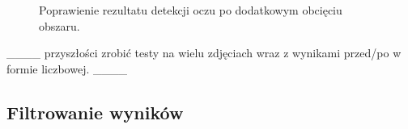 \documentclass[10pt, a4paper]{article}
\begin{document}
\begin{figure}[H]
    \begin{center}
        \hspace{8mm}
    \end{center}
    \caption{Poprawienie rezultatu detekcji oczu po dodatkowym obcięciu obszaru. \cite{readheadPortrait2}}
    \label{fig:eye_detect_crop}
\end{figure}

{\_\_\_\_} przyszłości zrobić testy na wielu zdjęciach wraz z wynikami przed/po w formie liczbowej. {\_\_\_\_}

\subsection{Filtrowanie wyników}
\end{document}
